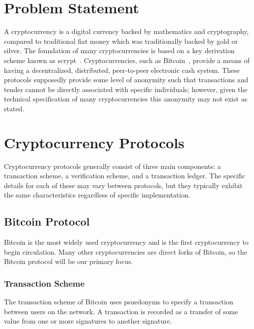 \documentclass[11pt]{article}
\begin{document}
\section{Problem Statement}
A cryptocurrency is a digital currency backed by mathematics and
cryptography, compared to traditional fiat money which was traditionally backed by gold
or silver. The foundation of many cryptocurrencies is based on a key derivation
scheme known as scrypt~\cite{percival09}.
Cryptocurrencies, such as Bitcoin~\cite{nakamoto08}, provide a means of having a
decentralized, distributed, peer-to-peer electronic cash system. These protocols
supposedly provide some level of anonymity such that transactions and tender
cannot be directly associated with specific individuals; however, given the
technical specification of many cryptocurrencies this anonymity may not exist
as stated.

\section{Cryptocurrency Protocols}
Cryptocurrency protocols generally consist of three main components: a
transaction scheme, a verification scheme, and a transaction ledger. The specific
details for each of these may vary between protocols, but they typically exhibit
the same characteristics regardless of specific implementation.

\subsection{Bitcoin Protocol}
Bitcoin is the most widely used cryptocurrency and is the first cryptocurrency
to begin circulation. Many other cryptocurrencies are direct forks of Bitcoin,
so the Bitcoin protocol will be our primary focus.

\subsubsection{Transaction Scheme}
The transaction scheme of Bitcoin uses psuedonyms to specify a transaction
between users on the network. A transaction is recorded as a transfer of some
value from one or more signatures to another signature.
\end{document}
